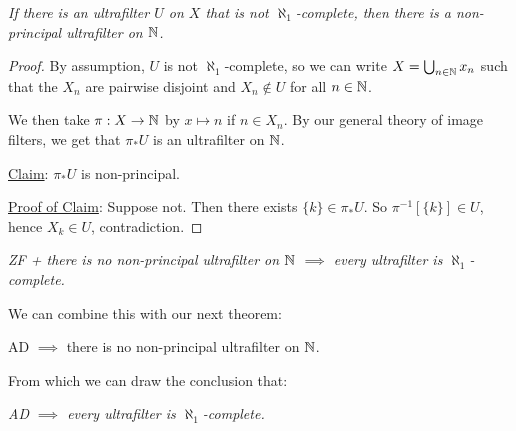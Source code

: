 \documentclass[]{article}
\begin{document}
\begin{remark*}[Lemma]
    \emph{
        If there is an ultrafilter $U$ on $X$ that is not $\aleph_1$-complete, then there is a non-principal ultrafilter on $\mathbb{N}$.
    }
\end{remark*}
\begin{proof}
    By assumption, $U$ is not $\aleph_1$-complete, so we can write $X = \bigcup_{n\in\mathbb{N}}x_n$ such that the $X_n$ are pairwise disjoint and $X_n \not\in U$ for all $n\in\mathbb{N}$.

    We then take $\pi : X \rightarrow \mathbb{N}$ by $x\mapsto n$ if $n\in X_n$. By our general theory of image filters, we get that $\pi_\ast U$ is an ultrafilter on $\mathbb{N}$.

    \underline{Claim}: $\pi_\ast U$ is non-principal.

    \underline{Proof of Claim}: Suppose not. Then there exists $\{k\}\in \pi_\ast U$. So $\pi^{-1}[\{k\}] \in U$, hence $X_k \in U$, contradiction.
\end{proof}
\begin{remark*}[Corollay]
    \emph{
        ZF + there is no non-principal ultrafilter on $\mathbb{N}$ $\implies$ every ultrafilter is $\aleph_1$-complete.
    }
\end{remark*}
We can combine this with our next theorem:
\begin{theorem*}
    AD $\implies$ there is no non-principal ultrafilter on $\mathbb{N}$.
\end{theorem*}
From which we can draw the conclusion that:
\begin{remark*}[Corollary]
    \emph{
        AD $\implies$ every ultrafilter is $\aleph_1$-complete.
    }
\end{remark*}
\end{document}
